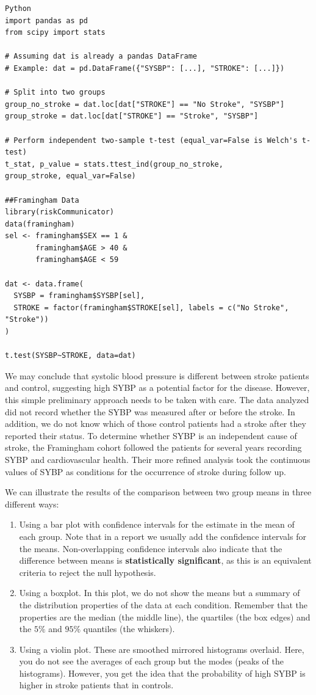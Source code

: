 \documentclass[
]{book}
\begin{document}
\begin{verbatim}
Python
import pandas as pd
from scipy import stats

# Assuming dat is already a pandas DataFrame
# Example: dat = pd.DataFrame({"SYSBP": [...], "STROKE": [...]})

# Split into two groups
group_no_stroke = dat.loc[dat["STROKE"] == "No Stroke", "SYSBP"]
group_stroke = dat.loc[dat["STROKE"] == "Stroke", "SYSBP"]

# Perform independent two-sample t-test (equal_var=False is Welch's t-test)
t_stat, p_value = stats.ttest_ind(group_no_stroke,
group_stroke, equal_var=False)

##Framingham Data
library(riskCommunicator)
data(framingham)
sel <- framingham$SEX == 1 &
       framingham$AGE > 40 &
       framingham$AGE < 59

dat <- data.frame(
  SYSBP = framingham$SYSBP[sel],
  STROKE = factor(framingham$STROKE[sel], labels = c("No Stroke", "Stroke"))
)

t.test(SYSBP~STROKE, data=dat)
\end{verbatim}

We may conclude that systolic blood pressure is different between stroke patients and control, suggesting high SYBP as a potential factor for the disease. However, this simple preliminary approach needs to be taken with care. The data analyzed did not record whether the SYBP was measured after or before the stroke. In addition, we do not know which of those control patients had a stroke after they reported their status. To determine whether SYBP is an independent cause of stroke, the Framingham cohort followed the patients for several years recording SYBP and cardiovascular health. Their more refined analysis took the continuous values of SYBP as conditions for the occurrence of stroke during follow up.

We can illustrate the results of the comparison between two group means in three different ways:

\begin{enumerate}
\def\labelenumi{\arabic{enumi}.}
\item
  Using a bar plot with confidence intervals for the estimate in the mean of each group. Note that in a report we usually add the confidence intervals for the means. Non-overlapping confidence intervals also indicate that the difference between means is \textbf{statistically significant}, as this is an equivalent criteria to reject the null hypothesis.
\item
  Using a boxplot. In this plot, we do not show the means but a summary of the distribution properties of the data at each condition. Remember that the properties are the median (the middle line), the quartiles (the box edges) and the \(5\%\) and \(95\%\) quantiles (the whiskers).
\item
  Using a violin plot. These are smoothed mirrored histograms overlaid. Here, you do not see the averages of each group but the modes (peaks of the histograms). However, you get the idea that the probability of high SYBP is higher in stroke patients that in controls.
\end{enumerate}
\end{document}
